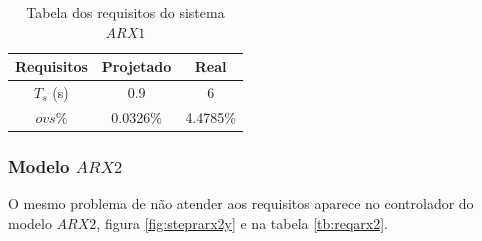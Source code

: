 \begin{table}[htb]
	\centering
	\begin{tabular}{|c|c|c|}
		\hline 
		Requisitos & Projetado & Real \\ 
		\hline 
		$T_s$ (s) & 0.9 & 6 \\ 
		\hline 
		$ovs\%$ & 0.0326\% & 4.4785\% \\ 
		\hline 
	\end{tabular} 
	\caption{Tabela dos requisitos do sistema $ARX1$}
	\label{tb:reqarx1}
\end{table}

\subsubsection{Modelo $ARX2$}
O mesmo problema de não atender aos requisitos aparece no controlador do modelo $ARX2$, figura \ref{fig:steprarx2y} e na tabela \ref{tb:reqarx2}.
